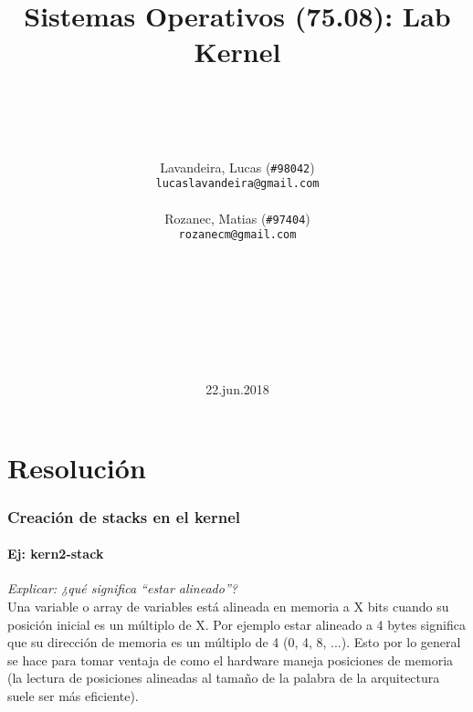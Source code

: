 \documentclass{article}
\title{Sistemas Operativos (75.08): Lab Kernel}
\author{
    \\\\\\\\
    Lavandeira, Lucas (\texttt{\#98042})\\\texttt{lucaslavandeira@gmail.com}\\
    \\
    Rozanec, Matias (\texttt{\#97404})\\\texttt{rozanecm@gmail.com}\\
    \\\\\\\\\\\\\\
}
\date{22.jun.2018}
\begin{document}
\maketitle
\newpage

\tableofcontents
\newpage


\part{Resolución}
\section{Creación de stacks en el kernel}

\subsection{Ej: kern2-stack}
\textit{Explicar: ¿qué significa “estar alineado”?}\\
Una variable o array de variables está alineada en memoria a X bits cuando su posición inicial es un múltiplo de X. Por ejemplo estar alineado a 4 bytes significa que su dirección de memoria es un múltiplo de 4 (0, 4, 8, ...). Esto por lo general se hace para tomar ventaja de como el hardware maneja posiciones de memoria (la lectura de posiciones alineadas al tamaño de la palabra de la arquitectura suele ser más eficiente). 
                                                                                
\end{document}
